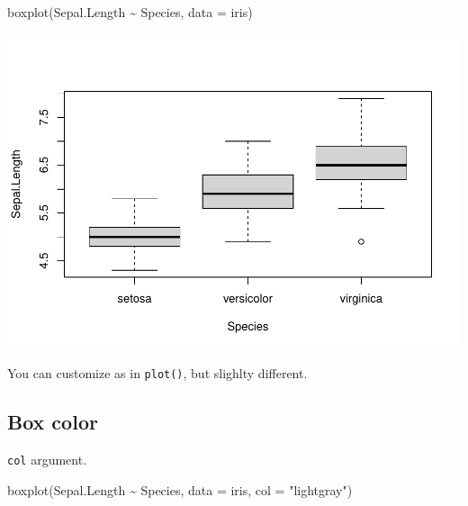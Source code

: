 \documentclass[
]{book}
\newenvironment{Shaded}{\begin{snugshade}}{\end{snugshade}}
\newcommand{\AttributeTok}[1]{\textcolor[rgb]{0.77,0.63,0.00}{#1}}
\newcommand{\FunctionTok}[1]{\textcolor[rgb]{0.00,0.00,0.00}{#1}}
\newcommand{\NormalTok}[1]{#1}
\newcommand{\SpecialCharTok}[1]{\textcolor[rgb]{0.00,0.00,0.00}{#1}}
\newcommand{\StringTok}[1]{\textcolor[rgb]{0.31,0.60,0.02}{#1}}
\begin{document}
\begin{Shaded}
\begin{Highlighting}[]
\FunctionTok{boxplot}\NormalTok{(Sepal.Length }\SpecialCharTok{\textasciitilde{}}\NormalTok{ Species, }\AttributeTok{data =}\NormalTok{ iris)}
\end{Highlighting}
\end{Shaded}

\begin{center}\includegraphics{_main_files/figure-latex/unnamed-chunk-123-1} \end{center}

You can customize as in \texttt{plot()}, but slighlty different.

\hypertarget{box-color}{%
\subsection{Box color}\label{box-color}}

\texttt{col} argument.

\begin{Shaded}
\begin{Highlighting}[]
\FunctionTok{boxplot}\NormalTok{(Sepal.Length }\SpecialCharTok{\textasciitilde{}}\NormalTok{ Species, }\AttributeTok{data =}\NormalTok{ iris,}
        \AttributeTok{col =} \StringTok{"lightgray"}\NormalTok{)}
\end{Highlighting}
\end{Shaded}
\end{document}
